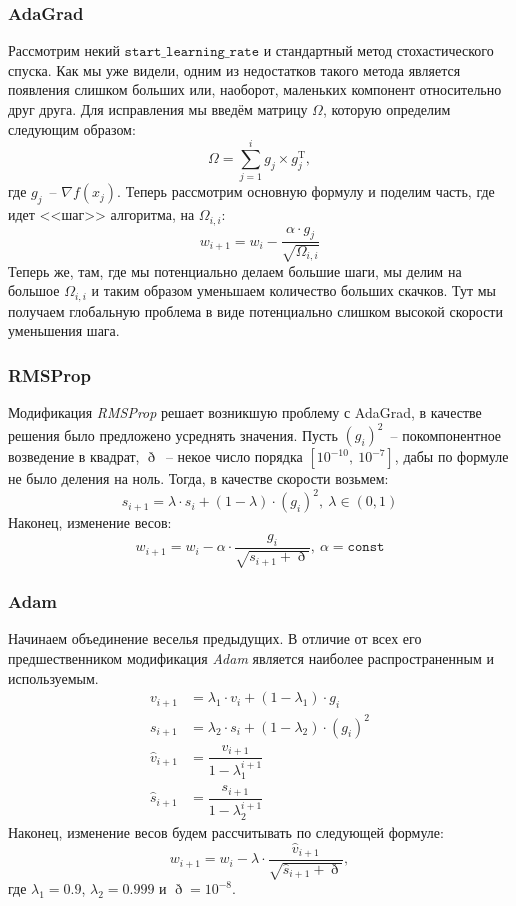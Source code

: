 \documentclass[12pt, a4paper, oneside, final]{article}
\begin{document}
	\subsubsection*{AdaGrad}
	Рассмотрим некий $\mathtt{start\_learning\_rate}$ и стандартный метод стохастического спуска.
	Как мы уже видели, одним из недостатков такого метода является появления слишком больших или, наоборот, маленьких компонент относительно друг друга.
	Для исправления мы введём матрицу $\Omega$, которую определим следующим образом:
	\[
		\Omega = \sum\limits_{j = 1}^{i}{g_{j} \times g_{j}^{\mathrm{T}}},
	\] где $g_{j}$~-- $\nabla{f(x_{j})}$.
	Теперь рассмотрим основную формулу и поделим часть, где идет <<шаг>> алгоритма, на $\Omega_{i, i}$:
	\[
		w_{i + 1} = w_{i} - \dfrac{\alpha \cdot g_{j}}{\sqrt{\Omega_{i, i}}}
	\]
	Теперь же, там, где мы потенциально делаем большие шаги, мы делим на большое $\Omega_{i, i}$ и таким образом уменьшаем количество больших скачков.
	Тут мы получаем глобальную проблема в виде потенциально слишком высокой скорости уменьшения шага.
	\subsubsection*{RMSProp}
	Модификация \textit{RMSProp} решает возникшую проблему с AdaGrad, в качестве решения было предложено усреднять значения.
	Пусть $(g_{i})^{2}$~-- покомпонентное возведение в квадрат, $\eth$~-- некое число порядка $[10^{-10}, ~ 10^{-7}]$, дабы по формуле не было деления на ноль.
	Тогда, в качестве скорости возьмем:
	\[
		s_{i + 1} = \lambda \cdot s_{i} + (1 - \lambda) \cdot (g_{i})^{2}, ~ \lambda \in (0, 1)
	\]
	Наконец, изменение весов:
	\[
		w_{i + 1} = w_{i} - \alpha \cdot \dfrac{g_{i}}{\sqrt{s_{i + 1} + \eth}}, ~ \alpha = \mathtt{const}
	\]
	\subsubsection*{Adam}
	Начинаем объединение веселья предыдущих.
	В отличие от всех его предшественником модификация \textit{Adam} является наиболее распространенным и используемым.
	\begin{align*}
		v_{i + 1} &= \lambda_{1} \cdot v_{i} + (1 - \lambda_{1}) \cdot g_{i} \\
		s_{i + 1} &= \lambda_{2} \cdot s_{i} + (1 - \lambda_{2}) \cdot (g_{i})^{2} \\
		\hat{v}_{i + 1} &= \dfrac{v_{i + 1}}{1 - \lambda_{1}^{i + 1}} \\
		\hat{s}_{i + 1} &= \dfrac{s_{i + 1}}{1 - \lambda_{2}^{i + 1}}
	\end{align*}
	Наконец, изменение весов будем рассчитывать по следующей формуле:
	\[
		w_{i + 1} = w_{i} - \lambda \cdot \dfrac{\hat{v}_{i + 1}}{\sqrt{\hat{s}_{i + 1} + \eth}},
	\] где $\lambda_{1} = 0.9$, $\lambda_{2} = 0.999$ и $\eth = 10^{-8}$.
\end{document}
